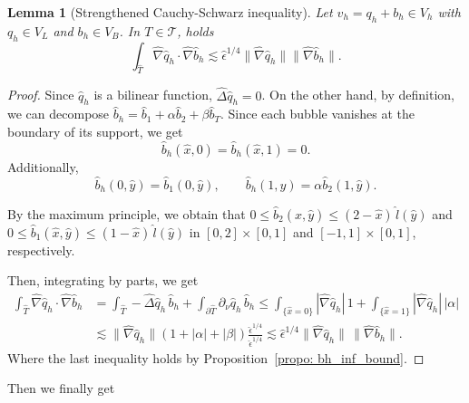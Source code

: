 \documentclass{article}
\newtheorem{lemma}[thm]{Lemma}
\newcommand{\T}{\ensuremath{\mathcal{T}}\xspace}
\newcommand{\hatT}{\ensuremath{{\hat{T}}}}
\newcommand{\hatb}{\ensuremath{\hat{b}}}
\newcommand{\hatx}{\ensuremath{{\hat{x}}}}
\newcommand{\haty}{\ensuremath{{\hat{y}}}}
\newcommand{\hatD}{\ensuremath{\hat{\Delta}}}
\newcommand{\hatN}{\ensuremath{\hat{\nabla}}}
\begin{document}
\begin{appendix}
\begin{lemma}[Strengthened Cauchy-Schwarz inequality]
\label{lemma:Streng_CS}
Let ${v_h = q_h + b_h}\in V_h$ with $q_h \in V_L$  and $b_h \in V_B$. In $T\in \T$, holds
\begin{equation*}
    \int_\hatT\hatN \hat{q}_h \cdot \hatN \hat{b}_h \lesssim \hat{\epsilon}^{1/4}\|\hatN \hat{q}_h\| \|\hatN \hat{b}_h\|.
\end{equation*}
\end{lemma}

\begin{proof}

Since $\hat{q}_h$ is a bilinear function,  $\hatD \hat{q}_h = 0$.
 On the other hand, by definition,  we can decompose $\hatb_h = \hatb_1 + \alpha \hatb_2+\beta \hatb_T$. Since each bubble vanishes at the boundary of its support, we get
\begin{equation*}
\hatb_h(\hatx,0) = \hatb_h(\hatx,1) = 0.
\end{equation*}
Additionally, 
\begin{equation*}
    \hatb_h(0,\haty) = \hatb_1(0,\haty), \qquad
    \hatb_h(1,y) = \alpha \hatb_2(1,\haty).
\end{equation*}

By the maximum principle, we obtain that $0\leq \hatb_2(\hatx,\haty)\leq (2-\hatx)\,\hat l(\haty)$ and $0\leq \hatb_1(\hatx,\haty)\leq (1-\hatx)\, \hat l(\haty)$ in $[0,2]\times[0,1]$ and $[-1,1]\times[0,1]$, respectively. 


Then,  integrating by parts, we get
\begin{align*}
    \int_\hatT \hatN \hat{q}_h \cdot\hatN \hatb_h & = 
    \int_\hatT - \hatD \hat{q}_h \, \hat{b}_h
    + \int_{\partial \hatT} \partial_\nu \hat{q}_h  \, \hat{b}_h
    \le
    \int_{\{\hatx=0\}} |\hatN \hat{q}_h| \, 1 + \int_{\{\hatx=1\}} |\hatN \hat{q}_h| \,|\alpha|
    \\
    &\lesssim \| \hatN  \hat{q}_h\| 
    (1+|\alpha|+|\beta|)
    \frac{\hat{\epsilon}^{1/4}}{\hat{\epsilon}^{1/4}}
    \lesssim \hat{\epsilon}^{1/4} \| \hatN \hat{q}_h \| \, \| \hatN \hat{b}_h\|.
\end{align*}
Where the last inequality holds by Proposition~\ref{propo: bh_inf_bound}.
\end{proof}


Then we finally get


\end{appendix}
\end{document}
